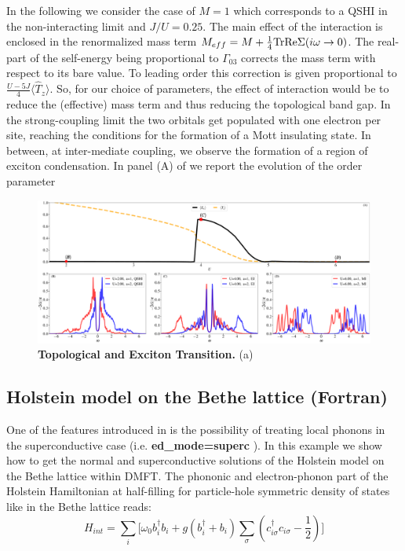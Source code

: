 \documentclass[edipack2.tex]{subfiles}
\begin{document}
In the following we consider the case of $M=1$ which corresponds to a
QSHI in the non-interacting limit and $J/U=0.25$. 
%
The main effect of the interaction is enclosed in the renormalized
mass term $M_{eff}=M+\tfrac{1}{4}{\rm Tr}{{\rm Re}\Sigma(i\omega\to0)}$. The
real-part of the self-energy being proportional to $\Gamma_{03}$
corrects the mass term with respect to its bare value. To leading
order this correction is given proportional to $\tfrac{U-5J}{4}\langle
\hat{T}_z\rangle$. So, for our choice of parameters, the effect of
interaction would be to reduce the (effective) mass term and thus
reducing the topological band gap. In the strong-coupling limit the
two orbitals get populated with one electron per site, reaching the
conditions for the formation of a Mott insulating state.
In between, at inter-mediate coupling, we observe the formation of a
region of exciton condensation.
In panel (A) of  we report the evolution of the order
parameter 






\begin{figure}[t!]
  \includegraphics[width=\linewidth]{figures/figBHZ.pdf}
    \caption{\label{figEx4}%
      \textbf{Topological and Exciton Transition.}
      (a)
    }
\end{figure}






\subsection{Holstein model on the Bethe lattice (Fortran)}

One of the features introduced in \NAME is the possibility of treating local phonons in the superconductive case (i.e. \textbf{ed\_mode=superc} ). In this example we show how to get the normal and superconductive solutions of the Holstein model on the Bethe lattice within DMFT. The phononic and electron-phonon part of the Holstein Hamiltonian at half-filling for particle-hole symmetric density of states like in the Bethe lattice reads:
\begin{equation} \label{eqex:H_Holstein}
    H_{int} = \sum_i \Big[\omega_0 b^\dagger_i b_i + g(b^\dagger_i + b_i)\sum_{\sigma}(c^\dagger_{i\sigma}c_{i\sigma} -\frac{1}{2})\Big]
\end{equation}
\end{document}
